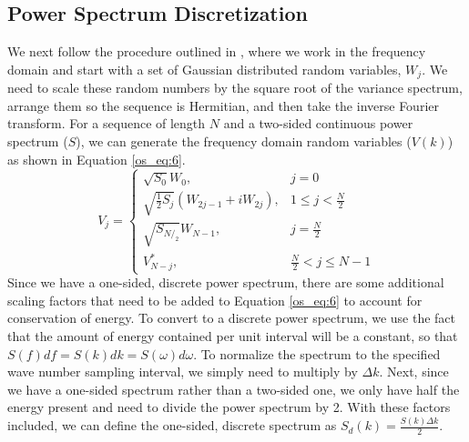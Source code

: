 \subsection{Power Spectrum Discretization}
We next follow the procedure outlined in \cite{percival_spectra},  where we work in the frequency domain and start with a set of Gaussian distributed random variables, $W_j$. We need to scale these random numbers by the square root of the variance spectrum, arrange them so the sequence is Hermitian, and then take the inverse Fourier transform. For a sequence of length $N$ and a two-sided continuous power spectrum ($S$), we can generate the frequency domain random variables ($V(k)$) as shown in Equation \ref{os_eq:6}.
\begin{equation}
  \label{os_eq:6}   
  V_j = \begin{cases}
    \sqrt{S_0}W_0, & j = 0 \\
    \sqrt{\frac{1}{2}S_j}\left(W_{2j-1} + iW_{2j} \right), & 1 \leq j <\frac{N}{2} \\
    \sqrt{S_{N/_2}}W_{N-1}, & j = \frac{N}{2} \\
    V_{N-j}^*, &  \frac{N}{2} < j \leq N-1 
  \end{cases} 
\end{equation}
Since we have a one-sided, discrete power spectrum, there are some additional scaling factors that need to be added to Equation \ref{os_eq:6} to account for conservation of energy. To convert to a discrete power spectrum, we use the fact that the amount of energy contained per unit interval will be a constant, so that $S(f)df = S(k)dk = S(\omega) d\omega$. To normalize the spectrum to the specified wave number sampling interval, we simply need to multiply by $\Delta k$. Next, since we have a one-sided spectrum rather than a two-sided one, we only have half the energy present and need to divide the power spectrum by 2. With these factors included, we can define the one-sided, discrete spectrum as $S_d(k) = \frac{S(k)\Delta k}{2}$.

